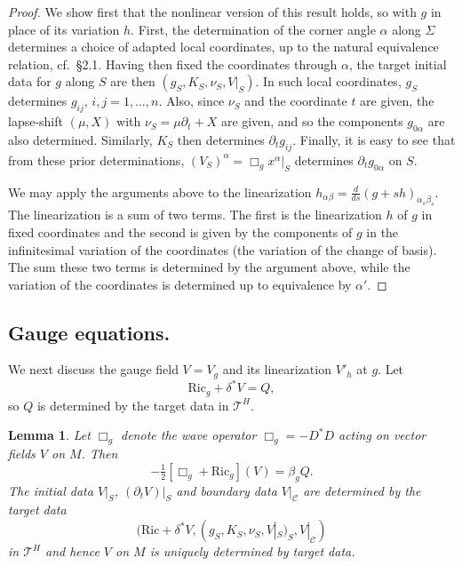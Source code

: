 \documentclass[10pt]{amsart}
\renewcommand{\a}{\alpha}
\renewcommand{\b}{\beta}
\renewcommand{\d}{\delta}
\newcommand{\Si}{\Sigma}
\newcommand{\cC}{{\mathcal C}}
\newcommand{\cT}{{\mathcal T}}
\newcommand{\Ric}{\mathrm{Ric}}
\newcommand{\be}{\begin{equation}}
\newcommand{\ee}{\end{equation}}
\newcommand{\p}{\partial}
\newcommand{\<}{\langle}
\renewcommand{\>}{\rangle}
\theoremstyle{plain}
\newtheorem{lemma}{Lemma}[section]
\theoremstyle{remark}
\theoremstyle{definition}
\numberwithin{equation}{section}
\begin{document}
\begin{proof} 
We show first that the nonlinear version of this result holds, so with $g$ in place of its variation $h$. First, the determination of the corner angle 
$\a$ along $\Si$ determines a choice of adapted local coordinates, up to the natural equivalence relation, cf.~\S 2.1. Having then fixed the 
coordinates through $\a$, the target initial data for $g$ along $S$ are then $(g_S, K_S, \nu_S, V|_S)$. In such local coordinates, $g_S$ determines 
$g_{ij}$, $i, j = 1,\dots, n$. Also, since $\nu_S$ and the coordinate $t$ are given, the lapse-shift $(\mu, X)$ with $\nu_S = \mu \p_t + X$ are given, 
and so the components $g_{0\a}$ are also determined. Similarly, $K_S$ then determines $\p_t g_{ij}$. Finally, it is easy to see that from these prior 
determinations, $(V_S)^{\a} = \Box_g x^{\a}|_S$ determines $\p_t g_{0\a}$ on $S$. 

  We may apply the arguments above to the linearization $h_{\a\b} = \frac{d}{ds}(g + sh)_{\a_s\b_s}$. The linearization is a sum of two terms. 
The first is the linearization $h$ of $g$ in fixed coordinates and the second is given by the components of $g$ in the infinitesimal 
variation of the coordinates (the variation of the change of basis). The sum these two terms is determined by the argument above, while the 
variation of the coordinates is determined up to equivalence by $\a'$. 

\end{proof}


\subsection{Gauge equations.}

 We next discuss the gauge field $V = V_g$ and its linearization $V'_h$ at $g$. Let 
\be \label{V0}
\Ric_g + \d^*V = Q,
\ee
so $Q$ is determined by the target data in $\cT^H$.  

\begin{lemma}\label{Gauge-lemma}
Let $\Box_g$ denote the wave operator $\Box_g = - D^*D$ acting on vector fields $V$ on $M$. Then  
\be \label{V}
-\tfrac{1}{2}[\Box_g + \Ric_g](V) = \b_g Q.
\ee
The initial data $V|_S$, $(\p_t V)|_S$ and boundary data $V|_{\cC}$ are determined by the target data  
$$(\Ric + \d^*V, (g_S, K_S, \nu_S, V|_S)_S, V|_{\cC})$$
in $\cT^H$ and hence $V$ on $M$ is uniquely determined by target data. 

\end{lemma}
\end{document}

